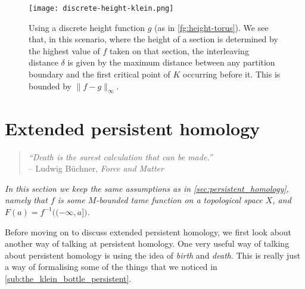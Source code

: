 \documentclass[12pt]{article}
\numberwithin{equation}{subsection}
\numberwithin{theorem}{subsection}
\numberwithin{lemma}{subsection}
\numberwithin{corollary}{subsection}
\numberwithin{definition}{subsection}
\numberwithin{example}{subsection}
\numberwithin{note}{subsection}
\begin{document}
            \begin{figure}[hpt]
                \centering
                \texttt{[image: discrete-height-klein.png]}
                \caption{Using a discrete height function $g$ (as in \cref{fg:height-torus}). We see that, in this scenario, where the height of a section is determined by the highest value of $f$ taken on that section, the interleaving distance $\delta$ is given by the maximum distance between any partition boundary and the first critical point of $K$ occurring before it. This is bounded by $\|f-g\|_\infty$.}\label{fg:discrete-height-klein}
            \end{figure}




















    \section{Extended persistent homology} %
    \label{sec:extended_persistence_homology}

        \begin{quotation}
            \raggedleft
            \emph{``Death is the surest calculation that can be made.''}\\
            -- Ludwig Büchner, \emph{Force and Matter}
        \end{quotation}

        \emph{In this section we keep the same assumptions as in \cref{sec:persistent_homology}, namely that $f$ is some $M$-bounded tame function on a topological space $X$, and $F(a)=f^{-1}\big((-\infty,a]\big)$.}

        \bigskip

        Before moving on to discuss extended persistent homology, we first look about another way of talking at persistent homology.
        One very useful way of talking about persistent homology is using the idea of \emph{birth} and \emph{death}.
        This is really just a way of formalising some of the things that we noticed in \cref{sub:the_klein_bottle_persistent}.
\end{document}
